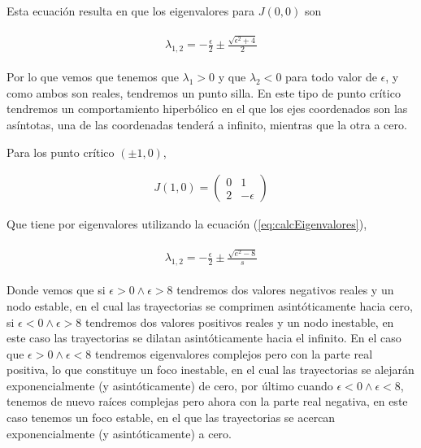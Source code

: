 \documentclass[a4paper,10pt]{article}
\begin{document}
Esta ecuación resulta en que los eigenvalores para $J(0,0)$ son

\begin{align}
 \begin{split}
  \lambda_{1,2} = - \frac{\epsilon}{2} \pm \frac{\sqrt{\epsilon^2 + 4}}{2}
 \end{split}
\end{align}

Por lo que vemos que tenemos que $\lambda_1 > 0$ y que $\lambda_2 < 0$ para todo valor
de $\epsilon$, y como ambos son reales, tendremos un punto silla. En este tipo de punto
crítico tendremos un comportamiento hiperbólico en el que los ejes coordenados son 
las asíntotas, una de las coordenadas tenderá a infinito, mientras que la otra a cero.

Para los punto crítico $(\pm 1,0)$,

\begin{align}
J(1,0) = \begin{pmatrix}
     0 & 1 \\
     2 & -\epsilon
\end{pmatrix}
\label{eq:jacobiana3s}
\end{align}

Que tiene por eigenvalores utilizando la ecuación (\ref{eq:calcEigenvalores}),

\begin{align}
 \begin{split}
  \lambda_{1,2} = - \frac{\epsilon}{2} \pm \frac{\sqrt{e^2-8}}{s}
 \end{split}
\end{align}

Donde vemos que si $\epsilon > 0 \wedge \epsilon > 8$ tendremos dos valores negativos
reales y un nodo estable, en el cual las trayectorias se comprimen asintóticamente hacia
cero, si $\epsilon < 0 \wedge \epsilon > 8$ tendremos dos valores positivos reales y un
nodo inestable, en este caso las trayectorias se dilatan asintóticamente hacia el infinito.
En el caso que $\epsilon > 0 \wedge \epsilon < 8$ tendremos eigenvalores complejos
pero con la parte real positiva, lo que constituye un foco inestable, en el cual las trayectorias
se alejarán exponencialmente (y asintóticamente) de cero, por último cuando $\epsilon < 0 \wedge \epsilon < 8$, tenemos
de nuevo raíces complejas pero ahora con la parte real negativa, en este caso tenemos un
foco estable, en el que las trayectorias se acercan exponencialmente (y asintóticamente) a cero.
\end{document}
